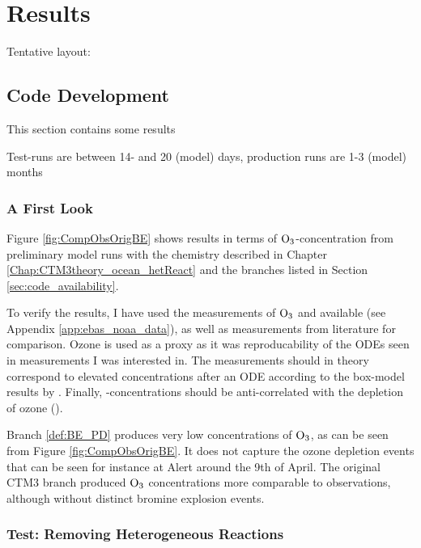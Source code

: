 \setcounter{chapter}{5}
\chapter{Results}\label{chap:results}

Tentative layout: 


\section{Code Development}\label{sec:results_code_development}

This section contains some results 

Test-runs are between 14- and 20 (model) days, production runs are 1-3 (model) months

\subsection{A First Look}

Figure \ref{fig:CompObsOrigBE} shows results in terms of $\mathrm{O_3}$-concentration from preliminary model runs with the chemistry described in Chapter \ref{Chap:CTM3theory_ocean_hetReact} and the branches listed in Section \ref{sec:code_availability}. 

\medskip

To verify the results, I have used the measurements of $\mathrm{O_3}$ and  available (see Appendix \ref{app:ebas_noaa_data}), as well as  measurements from literature for comparison. Ozone is used as a proxy as it was reproducability of the ODEs seen in measurements I was interested in. The  measurements should in theory correspond to elevated concentrations after an ODE according to the box-model results by \cite{CAO}. Finally, -concentrations should be anti-correlated with the depletion of ozone (\cite{barrie}). 

\medskip

Branch \ref{def:BE_PD} produces very low concentrations of $\mathrm{O_3}$, as can be seen from Figure \ref{fig:CompObsOrigBE}. It does not capture the ozone depletion events that can be seen for instance at Alert around the 9th of April. The original CTM3 branch produced $\mathrm{O_3}$ concentrations more comparable to observations, although without distinct bromine explosion events. 




\subsection{Test: Removing Heterogeneous Reactions}

